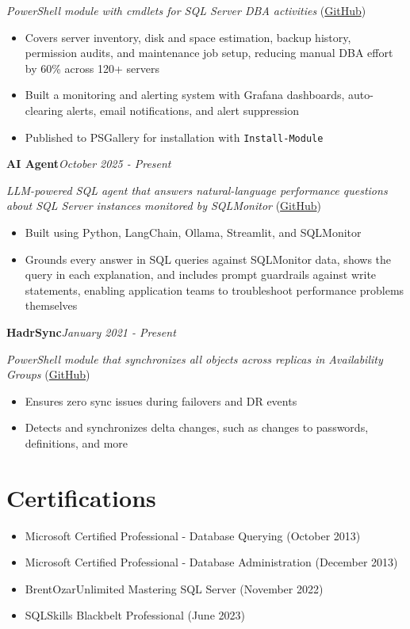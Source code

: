 \documentclass[10pt,a4paper]{article}
\begin{document}
\textit{PowerShell module with cmdlets for SQL Server DBA activities} (\href{https://github.com/imajaydwivedi/SQLDBATools}{GitHub})
\begin{itemize}
  \item Covers server inventory, disk and space estimation, backup history, permission audits, and maintenance job setup, reducing manual DBA effort by 60\% across 120+ servers
  \item Built a monitoring and alerting system with Grafana dashboards, auto-clearing alerts, email notifications, and alert suppression
  \item Published to PSGallery for installation with \texttt{Install-Module}
\end{itemize}
\vspace{14.7pt}
\noindent\textbf{AI Agent}\hfill \textit{October 2025 - Present}

\textit{LLM-powered SQL agent that answers natural-language performance questions about SQL Server instances monitored by SQLMonitor} (\href{https://github.com/imajaydwivedi/SQLMonitor/tree/dev/AI-Agent}{GitHub})
\begin{itemize}
  \item Built using Python, LangChain, Ollama, Streamlit, and SQLMonitor
  \item Grounds every answer in SQL queries against SQLMonitor data, shows the query in each explanation, and includes prompt guardrails against write statements, enabling application teams to troubleshoot performance problems themselves
\end{itemize}
\vspace{14.7pt}
\noindent\textbf{HadrSync}\hfill \textit{January 2021 - Present}

\textit{PowerShell module that synchronizes all objects across replicas in Availability Groups} (\href{https://github.com/imajaydwivedi/HadrSync}{GitHub})
\begin{itemize}
  \item Ensures zero sync issues during failovers and DR events
  \item Detects and synchronizes delta changes, such as changes to passwords, definitions, and more
\end{itemize}

\section{Certifications}
\begin{itemize}
  \item Microsoft Certified Professional - Database Querying (October 2013)
  \item Microsoft Certified Professional - Database Administration (December 2013)
  \item BrentOzarUnlimited Mastering SQL Server (November 2022)
  \item SQLSkills Blackbelt Professional (June 2023)
\end{itemize}
\end{document}
